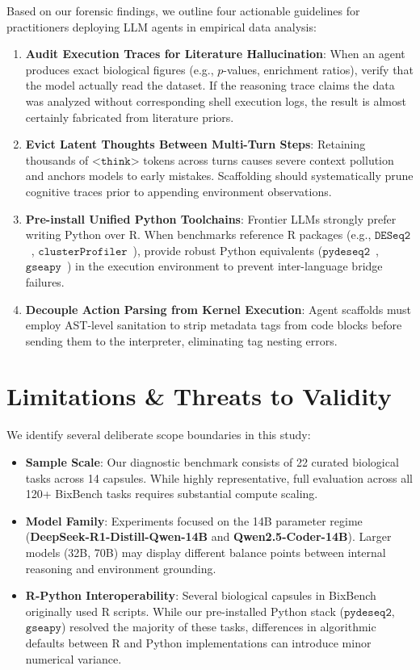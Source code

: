 \documentclass[11pt,letterpaper]{article}
\begin{document}
Based on our forensic findings, we outline four actionable guidelines for practitioners deploying LLM agents in empirical data analysis:
\begin{enumerate}
    \item \textbf{Audit Execution Traces for Literature Hallucination}: When an agent produces exact biological figures (e.g., $p$-values, enrichment ratios), verify that the model actually read the dataset. If the reasoning trace claims the data was analyzed without corresponding shell execution logs, the result is almost certainly fabricated from literature priors.
    \item \textbf{Evict Latent Thoughts Between Multi-Turn Steps}: Retaining thousands of $\texttt{<think>}$ tokens across turns causes severe context pollution and anchors models to early mistakes. Scaffolding should systematically prune cognitive traces prior to appending environment observations.
    \item \textbf{Pre-install Unified Python Toolchains}: Frontier LLMs strongly prefer writing Python over R. When benchmarks reference R packages (e.g., $\texttt{DESeq2}$~\cite{love2014deseq2}, $\texttt{clusterProfiler}$~\cite{wu2021clusterprofiler}), provide robust Python equivalents ($\texttt{pydeseq2}$~\cite{muzellec2023pydeseq2}, $\texttt{gseapy}$~\cite{fang2023gseapy}) in the execution environment to prevent inter-language bridge failures.
    \item \textbf{Decouple Action Parsing from Kernel Execution}: Agent scaffolds must employ AST-level sanitation to strip metadata tags from code blocks before sending them to the interpreter, eliminating tag nesting errors.
\end{enumerate}

\section{Limitations \& Threats to Validity}

We identify several deliberate scope boundaries in this study:
\begin{itemize}
    \item \textbf{Sample Scale}: Our diagnostic benchmark consists of 22 curated biological tasks across 14 capsules. While highly representative, full evaluation across all 120+ BixBench tasks requires substantial compute scaling.
    \item \textbf{Model Family}: Experiments focused on the 14B parameter regime (\textbf{DeepSeek-R1-Distill-Qwen-14B} and \textbf{Qwen2.5-Coder-14B}). Larger models (32B, 70B) may display different balance points between internal reasoning and environment grounding.
    \item \textbf{R-Python Interoperability}: Several biological capsules in BixBench originally used R scripts. While our pre-installed Python stack ($\texttt{pydeseq2}$, $\texttt{gseapy}$) resolved the majority of these tasks, differences in algorithmic defaults between R and Python implementations can introduce minor numerical variance.
\end{itemize}
\end{document}
